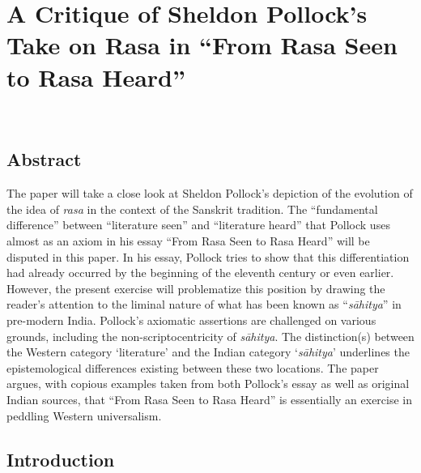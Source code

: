 \chapter[A Critique of Sheldon Pollock’s Take on Rasa...]{A Critique of Sheldon Pollock’s Take on Rasa in “From Rasa Seen to Rasa Heard”}\label{chapter\thechapter:begin}
~ 



\section*{Abstract}

The paper will take a close look at Sheldon Pollock’s depiction of the evolution of the idea of \textsl{rasa} in the context of the Sanskrit tradition. The “fundamental difference” between “literature seen” and “literature heard” that Pollock uses almost as an axiom in his essay “From Rasa Seen to Rasa Heard” will be disputed in this paper. In his essay, Pollock tries to show that this differentiation had already occurred by the beginning of the eleventh century or even earlier. However, the present exercise will problematize this position by drawing the reader’s attention to the liminal nature of what has been known as “\textsl{sāhitya}” in pre-modern India. Pollock’s axiomatic assertions are challenged on various grounds, including the non-scriptocentricity of \textsl{sāhitya}. The distinction(s) between the Western category ‘literature’ and the Indian category ‘\textsl{sāhitya}’ underlines the epistemological differences existing between these two locations. The paper argues, with copious examples taken from both Pollock’s essay as well as original Indian sources, that “From Rasa Seen to Rasa Heard” is essentially an exercise in peddling Western universalism.       



\section*{Introduction}


